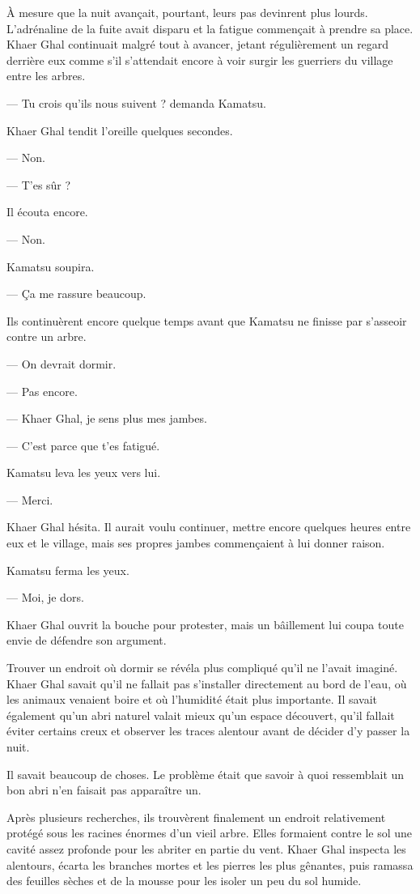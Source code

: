 À mesure que la nuit avançait, pourtant, leurs pas devinrent plus lourds.
L'adrénaline de la fuite avait disparu et la fatigue commençait à prendre sa
place. Khaer Ghal continuait malgré tout à avancer, jetant régulièrement un
regard derrière eux comme s'il s'attendait encore à voir surgir les guerriers
du village entre les arbres.

— Tu crois qu'ils nous suivent ? demanda Kamatsu.

Khaer Ghal tendit l'oreille quelques secondes.

— Non.

— T'es sûr ?

Il écouta encore.

— Non.

Kamatsu soupira.

— Ça me rassure beaucoup.

Ils continuèrent encore quelque temps avant que Kamatsu ne finisse par
s'asseoir contre un arbre.

— On devrait dormir.

— Pas encore.

— Khaer Ghal, je sens plus mes jambes.

— C'est parce que t'es fatigué.

Kamatsu leva les yeux vers lui.

— Merci.

Khaer Ghal hésita. Il aurait voulu continuer, mettre encore quelques heures
entre eux et le village, mais ses propres jambes commençaient à lui donner
raison.

Kamatsu ferma les yeux.

— Moi, je dors.

Khaer Ghal ouvrit la bouche pour protester, mais un bâillement lui coupa toute
envie de défendre son argument.

\scenebreak

Trouver un endroit où dormir se révéla plus compliqué qu'il ne l'avait imaginé.
Khaer Ghal savait qu'il ne fallait pas s'installer directement au bord de
l'eau, où les animaux venaient boire et où l'humidité était plus importante.
Il savait également qu'un abri naturel valait mieux qu'un espace découvert,
qu'il fallait éviter certains creux et observer les traces alentour avant de
décider d'y passer la nuit.

Il savait beaucoup de choses. Le problème était que savoir à quoi ressemblait
un bon abri n'en faisait pas apparaître un.

Après plusieurs recherches, ils trouvèrent finalement un endroit relativement
protégé sous les racines énormes d'un vieil arbre. Elles formaient contre le
sol une cavité assez profonde pour les abriter en partie du vent. Khaer Ghal
inspecta les alentours, écarta les branches mortes et les pierres les plus
gênantes, puis ramassa des feuilles sèches et de la mousse pour les isoler un
peu du sol humide.

